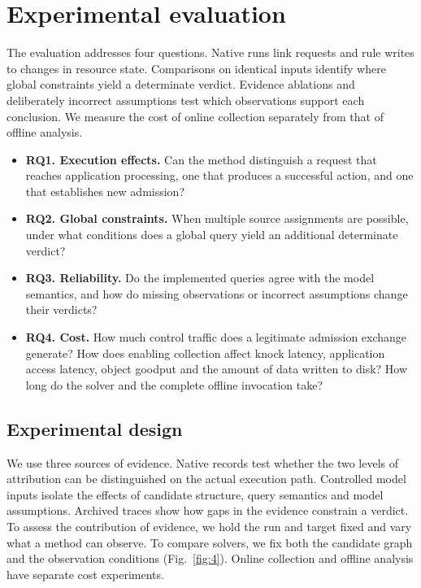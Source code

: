 \section{Experimental evaluation}\label{sec:experiments}

The evaluation addresses four questions. Native runs link requests and rule writes to changes in resource state. Comparisons on identical inputs identify where global constraints yield a determinate verdict. Evidence ablations and deliberately incorrect assumptions test which observations support each conclusion. We measure the cost of online collection separately from that of offline analysis.

\begin{itemize}
\item \textbf{RQ1. Execution effects.} Can the method distinguish a request that reaches application processing, one that produces a successful action, and one that establishes new admission?
\item \textbf{RQ2. Global constraints.} When multiple source assignments are possible, under what conditions does a global query yield an additional determinate verdict?
\item \textbf{RQ3. Reliability.} Do the implemented queries agree with the model semantics, and how do missing observations or incorrect assumptions change their verdicts?
\item \textbf{RQ4. Cost.} How much control traffic does a legitimate admission exchange generate? How does enabling collection affect knock latency, application access latency, object goodput and the amount of data written to disk? How long do the solver and the complete offline invocation take?
\end{itemize}

\subsection{Experimental design}\label{sec:design}\label{sec:setup}

We use three sources of evidence. Native records test whether the two levels of attribution can be distinguished on the actual execution path. Controlled model inputs isolate the effects of candidate structure, query semantics and model assumptions. Archived traces show how gaps in the evidence constrain a verdict. To assess the contribution of evidence, we hold the run and target fixed and vary what a method can observe. To compare solvers, we fix both the candidate graph and the observation conditions (Fig.~\ref{fig:4}). Online collection and offline analysis have separate cost experiments.

